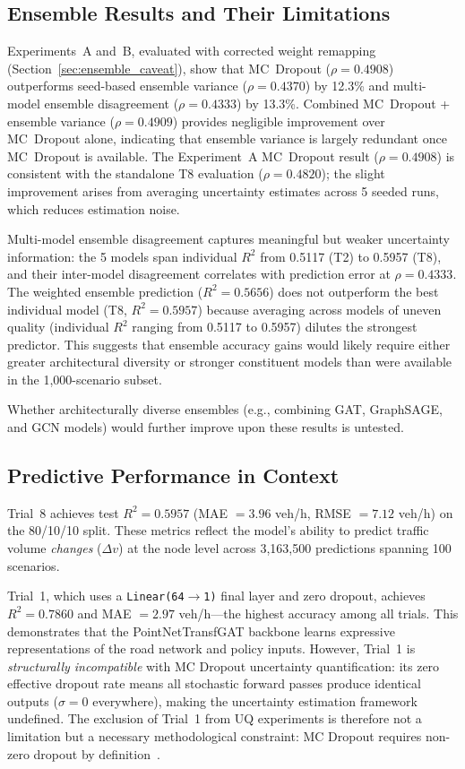 \subsection{Ensemble Results and Their Limitations}

Experiments~A and~B, evaluated with corrected weight remapping (Section~\ref{sec:ensemble_caveat}), show that MC~Dropout ($\rho = 0.4908$) outperforms seed-based ensemble variance ($\rho = 0.4370$) by 12.3\% and multi-model ensemble disagreement ($\rho = 0.4333$) by 13.3\%.  Combined MC~Dropout + ensemble variance ($\rho = 0.4909$) provides negligible improvement over MC~Dropout alone, indicating that ensemble variance is largely redundant once MC~Dropout is available.  The Experiment~A MC~Dropout result ($\rho = 0.4908$) is consistent with the standalone T8 evaluation ($\rho = 0.4820$); the slight improvement arises from averaging uncertainty estimates across 5 seeded runs, which reduces estimation noise.

Multi-model ensemble disagreement captures meaningful but weaker uncertainty information: the 5 models span individual $R^2$ from 0.5117 (T2) to 0.5957 (T8), and their inter-model disagreement correlates with prediction error at $\rho = 0.4333$.  The weighted ensemble prediction ($R^2 = 0.5656$) does not outperform the best individual model (T8, $R^2 = 0.5957$) because averaging across models of uneven quality (individual $R^2$ ranging from 0.5117 to 0.5957) dilutes the strongest predictor. This suggests that ensemble accuracy gains would likely require either greater architectural diversity or stronger constituent models than were available in the 1,000-scenario subset.

Whether architecturally diverse ensembles (e.g., combining GAT, GraphSAGE, and GCN models) would further improve upon these results is untested.

\subsection{Predictive Performance in Context}

Trial~8 achieves test $R^2 = 0.5957$ (MAE $= 3.96$ veh/h, RMSE $= 7.12$ veh/h) on the 80/10/10 split. These metrics reflect the model's ability to predict traffic volume \emph{changes} ($\Delta v$) at the node level across 3,163,500 predictions spanning 100 scenarios.

Trial~1, which uses a \texttt{Linear(64$\to$1)} final layer and zero dropout, achieves $R^2 = 0.7860$ and MAE $= 2.97$ veh/h---the highest accuracy among all trials. This demonstrates that the PointNetTransfGAT backbone learns expressive representations of the road network and policy inputs. However, Trial~1 is \emph{structurally incompatible} with MC Dropout uncertainty quantification: its zero effective dropout rate means all stochastic forward passes produce identical outputs ($\sigma = 0$ everywhere), making the uncertainty estimation framework undefined. The exclusion of Trial~1 from UQ experiments is therefore not a limitation but a necessary methodological constraint: MC Dropout requires non-zero dropout by definition~\cite{gal2016dropout}.

